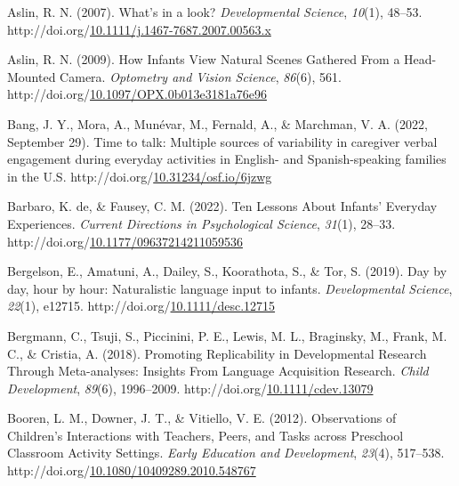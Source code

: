 \documentclass[10pt, letterpaper]{article}
\newlength{\cslhangindent}
\newlength{\cslentryspacingunit} %
\newenvironment{CSLReferences}[2] %
{%
	\setlength{\parindent}{0pt}
	\ifodd #1
	\let\oldpar\par
	\def\par{\hangindent=\cslhangindent\oldpar}
	\fi
}%
{}
\begin{document}
\hypertarget{refs}{}
\begin{CSLReferences}{1}{0}
\leavevmode{}%
Aslin, R. N. (2007). What's in a look? \emph{Developmental Science},
\emph{10}(1), 48--53.
http://doi.org/\href{https://doi.org/10.1111/j.1467-7687.2007.00563.x}{10.1111/j.1467-7687.2007.00563.x}

\leavevmode{}%
Aslin, R. N. (2009). How {Infants View Natural Scenes Gathered From} a
{Head-Mounted Camera}. \emph{Optometry and Vision Science},
\emph{86}(6), 561.
http://doi.org/\href{https://doi.org/10.1097/OPX.0b013e3181a76e96}{10.1097/OPX.0b013e3181a76e96}

\leavevmode{}%
Bang, J. Y., Mora, A., Munévar, M., Fernald, A., \& Marchman, V. A.
(2022, September 29). Time to talk: {Multiple} sources of variability in
caregiver verbal engagement during everyday activities in {English-} and
{Spanish-speaking} families in the {U}.{S}.
http://doi.org/\href{https://doi.org/10.31234/osf.io/6jzwg}{10.31234/osf.io/6jzwg}

\leavevmode{}%
Barbaro, K. de, \& Fausey, C. M. (2022). Ten {Lessons About Infants}'
{Everyday Experiences}. \emph{Current Directions in Psychological
Science}, \emph{31}(1), 28--33.
http://doi.org/\href{https://doi.org/10.1177/09637214211059536}{10.1177/09637214211059536}

\leavevmode{}%
Bergelson, E., Amatuni, A., Dailey, S., Koorathota, S., \& Tor, S.
(2019). Day by day, hour by hour: {Naturalistic} language input to
infants. \emph{Developmental Science}, \emph{22}(1), e12715.
http://doi.org/\href{https://doi.org/10.1111/desc.12715}{10.1111/desc.12715}

\leavevmode{}%
Bergmann, C., Tsuji, S., Piccinini, P. E., Lewis, M. L., Braginsky, M.,
Frank, M. C., \& Cristia, A. (2018). Promoting {Replicability} in
{Developmental Research Through Meta-analyses}: {Insights From Language
Acquisition Research}. \emph{Child Development}, \emph{89}(6),
1996--2009.
http://doi.org/\href{https://doi.org/10.1111/cdev.13079}{10.1111/cdev.13079}

\leavevmode{}%
Booren, L. M., Downer, J. T., \& Vitiello, V. E. (2012). Observations of
{Children}'s {Interactions} with {Teachers}, {Peers}, and {Tasks} across
{Preschool Classroom Activity Settings}. \emph{Early Education and
Development}, \emph{23}(4), 517--538.
http://doi.org/\href{https://doi.org/10.1080/10409289.2010.548767}{10.1080/10409289.2010.548767}


\end{CSLReferences}
\end{document}
